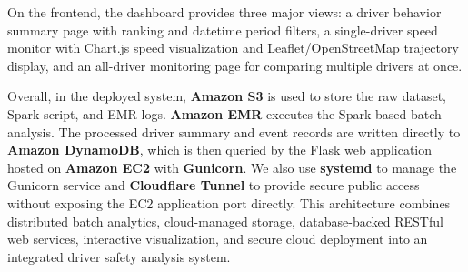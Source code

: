 \documentclass[12pt,a4paper]{article}
\begin{document}
On the frontend, the dashboard provides three major views: a driver behavior summary page with ranking and datetime period filters, a single-driver speed monitor with Chart.js speed visualization and Leaflet/OpenStreetMap trajectory display, and an all-driver monitoring page for comparing multiple drivers at once.

Overall, in the deployed system, \textbf{Amazon S3} is used to store the raw dataset, Spark script, and EMR logs. \textbf{Amazon EMR} executes the Spark-based batch analysis. The processed driver summary and event records are written directly to \textbf{Amazon DynamoDB}, which is then queried by the Flask web application hosted on \textbf{Amazon EC2} with \textbf{Gunicorn}. We also use \textbf{systemd} to manage the Gunicorn service and \textbf{Cloudflare Tunnel} to provide secure public access without exposing the EC2 application port directly. This architecture combines distributed batch analytics, cloud-managed storage, database-backed RESTful web services, interactive visualization, and secure cloud deployment into an integrated driver safety analysis system.
\end{document}
